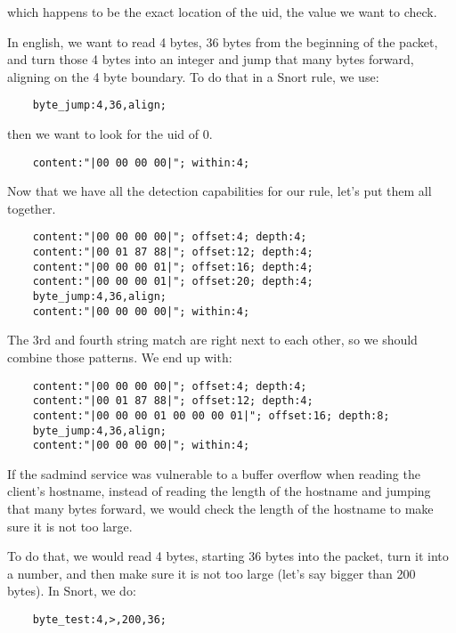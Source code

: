 \documentclass[english]{report}
\begin{document}
which happens to be the exact location of the uid, the value we want to check.

In english, we want to read 4 bytes, 36 bytes from the beginning of the packet, and turn those 4 bytes into an integer and jump that many bytes forward, aligning on the 4 byte boundary.  To do that in a Snort rule, we use:

\begin{verbatim}
    byte_jump:4,36,align;
\end{verbatim}

then we want to look for the uid of 0.

\begin{verbatim}
    content:"|00 00 00 00|"; within:4;
\end{verbatim}

Now that we have all the detection capabilities for our rule, let's put them all together.  

\begin{verbatim}
    content:"|00 00 00 00|"; offset:4; depth:4;
    content:"|00 01 87 88|"; offset:12; depth:4;
    content:"|00 00 00 01|"; offset:16; depth:4;
    content:"|00 00 00 01|"; offset:20; depth:4;
    byte_jump:4,36,align;
    content:"|00 00 00 00|"; within:4;
\end{verbatim}

The 3rd and fourth string match are right next to each other, so we should combine those patterns.  We end up with:

\begin{verbatim}
    content:"|00 00 00 00|"; offset:4; depth:4;
    content:"|00 01 87 88|"; offset:12; depth:4;
    content:"|00 00 00 01 00 00 00 01|"; offset:16; depth:8;
    byte_jump:4,36,align;
    content:"|00 00 00 00|"; within:4;
\end{verbatim}

If the sadmind service was vulnerable to a buffer overflow when reading the client's hostname, instead of reading the length of the hostname and jumping that many bytes forward, we would check the length of the hostname to make sure it is not too large.  

To do that, we would read 4 bytes, starting 36 bytes into the packet, turn it into a number, and then make sure it is not too large (let's say bigger than 200 bytes).  In Snort, we do: 

\begin{verbatim}
    byte_test:4,>,200,36;
\end{verbatim}
    
\end{document}
